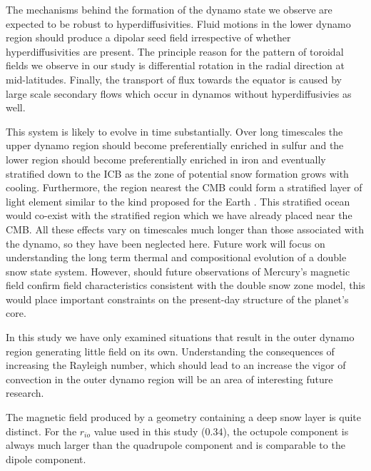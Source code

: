 The mechanisms behind the formation of the dynamo state we observe are expected to be robust to hyperdiffusivities. Fluid motions in the lower dynamo region should produce a dipolar seed field irrespective of whether hyperdiffusivities are present. The principle reason for the pattern of toroidal fields we observe in our study is differential rotation in the radial direction at mid-latitudes. Finally, the transport of flux towards the equator is caused by large scale secondary flows which occur in dynamos without hyperdiffusivies as well. 

This system is likely to evolve in time substantially. Over long timescales the upper dynamo region should become preferentially enriched in sulfur and the lower region should become preferentially enriched in iron and eventually stratified down to the ICB as the zone of potential snow formation grows with cooling. Furthermore, the region nearest the CMB could form a stratified layer of light element similar to the kind proposed for the Earth \citep{Braginsky2006}. This stratified ocean would co-exist with the stratified region which we have already placed near the CMB. All these effects vary on timescales much longer than those associated with the dynamo, so they have been neglected here. Future work will focus on understanding the long term thermal and compositional evolution of a double snow state system. However, should future observations of Mercury's magnetic field confirm field characteristics consistent with the double snow zone model, this would place important constraints on the present-day structure of the planet's core.

In this study we have only examined situations that result in the outer dynamo region generating little field on its own. Understanding the consequences of increasing the Rayleigh number, which should lead to an increase the vigor of convection in the outer dynamo region will be an area of interesting future research.

The magnetic field produced by a geometry containing a deep snow layer is quite distinct. For the $r_{io}$ value used in this study ($0.34$), the octupole component is always much larger than the quadrupole component and is comparable to the dipole component.

















